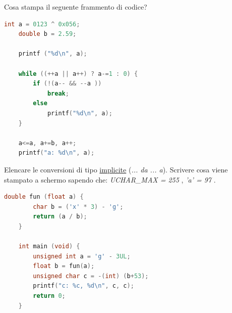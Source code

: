 
\begin{center}
\end{center}

\vspace{5mm}

\noindent{}

\begin{questions}


\question[5]
Cosa stampa il seguente frammento di codice?

\begin{minipage}[t]{0.4\linewidth}
	\begin{lstlisting}[language=C]
	int a = 0123 ^ 0x056;
	double b = 2.59;

	printf ("%d\n", a);
	
	while ((++a || a++) ? a-=1 : 0) {
		if (!(a-- && --a ))
			break;
		else
			printf("%d\n", a);
	}
	
	a<=a, a+=b, a++;
	printf("a: %d\n", a); 
	\end{lstlisting}
\end{minipage}
\begin{minipage}[t]{0.6\linewidth}
	\makeemptybox{120pt}
\end{minipage}



\question[6]
Elencare le conversioni di tipo \underline{implicite} (\emph{... da ... a}). Scrivere cosa viene stampato a schermo sapendo che: \emph{UCHAR\_MAX = 255} , \emph{'a' = 97} .

\begin{minipage}[t]{0.4\linewidth}
	\begin{lstlisting}[language=C]
	double fun (float a) {
		char b = ('x' * 3) - 'g';
		return (a / b);
	}
	
	int main (void) {
		unsigned int a = 'g' - 3UL;
		float b = fun(a);
		unsigned char c = -(int) (b+53);
		printf("c: %c, %d\n", c, c);
		return 0;
	}
	\end{lstlisting}
\end{minipage}
\begin{minipage}[t]{0.6\linewidth}
	\makeemptybox{200pt}
\end{minipage}


\end{questions}
